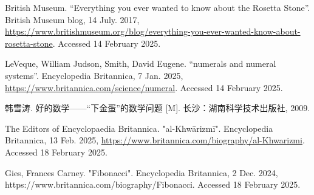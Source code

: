 \documentclass[b5paper]{ctexart}
\begin{document}
\begin{thebibliography}{99}

British Museum. ``Everything you ever wanted to know about the Rosetta Stone''. British Museum blog, 14 July. 2017, \url{https://www.britishmuseum.org/blog/everything-you-ever-wanted-know-about-rosetta-stone}. Accessed 14 February 2025.

LeVeque, William Judson, Smith, David Eugene. ``numerals and numeral systems''. Encyclopedia Britannica, 7 Jan. 2025, \url{https://www.britannica.com/science/numeral}. Accessed 14 February 2025.

韩雪涛. 好的数学——“下金蛋”的数学问题 [M]. 长沙：湖南科学技术出版社, 2009. %

The Editors of Encyclopaedia Britannica. "al-Khwārizmī". Encyclopedia Britannica, 13 Feb. 2025, \url{https://www.britannica.com/biography/al-Khwarizmi}. Accessed 18 February 2025.

Gies, Frances Carney. "Fibonacci". Encyclopedia Britannica, 2 Dec. 2024, https://www.britannica.com/biography/Fibonacci. Accessed 18 February 2025.




\end{thebibliography}

\expandafter\enddocument

\fi
\end{document}
